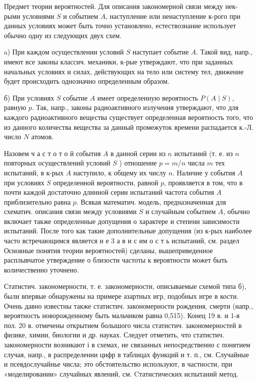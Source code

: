 \documentclass[10pt]{article}
\begin{document}
Предмет теории вероятностей. Для описания закономерной связи между нек-рыми условиями $S$ и событием $A$, наступление или ненаступление к-рого при данных условиях может быть точно установлено, естествознание использует обычно одну из следующих двух схем.



a) При каждом осуществлении условий $S$ наступает событие $A$. Такой вид, напр., имеют все законы классич. механики, к-рые утверждают, что при заданных начальных условиях и силах, действующих на тело или систему тел, движение будет происходить однозначно определенным образом.



б) При условиях $S$ событие $A$ имеет определенную вероятность $P(A \mid S)$, равную $p$. Так, напр., законы радиоактивного излучения утверждают, что для каждого радиоактивного вещества существует определенная вероятность того, что из данного количества вещества за данный промежуток времени распадается к.-Л. число $N$ атомов.



Назовем ч а с т о т о й события $A$ в данной серии из $n$ испытаний (т. е. из $n$ повторных осуществлений условий $S$ ) отношение $p=m / n$ числа $m$ тех испытаний, в к-рых $A$ наступило, к общему их числу $n$. Наличие у события $A$ при условиях $S$ определенной вероятности, равной $p$, проявляется в том, что в почти каждой достаточно длинной серии испытаний частота события $A$ приблизительно равна $p$. Всякая математич. модель, предназначенная для схематич. описания связи между условиями $S$ и случайным событием $A$, обычно включает также определенные допущения о характере и степени зависимости испытаний. После того как такие дополнительные допущения (из к-рых наиболее часто встречающимся является н е 3 а в и с им о с т ь испытаний, см. раздел Основные понятия теории вероятностей) сделаны, вышеприведенное расплывчатое утверждение о близости частоты к вероятности может быть количественно уточнено.



Статистич. закономерности, т. е. закономерности, описываемые схемой типа б), были впервые обнаружены на примере азартных игр, подобных игре в кости. Очень давно известны также статистич. закономерности рождения, смерти (напр., вероятность новорожденному быть мальчиком равна 0,515). Конец 19 в. и 1-я пол. 20 в. отмечены открытием болышого числа статистич. закономерностей в физике, химии, биологии и др. науках. Следует отметить, что статистич. закономерности возникают і в схемах, не связанных непосредственно с понятием случая, напр., в распределении цифр в таблицах функций и т. п., см. Случайные $и$ псевдослучайнье числа; это обстоятельство используют, в частности, при «моделировании» случайных явлений, см. Cтатистических испытаний метод.
\end{document}
